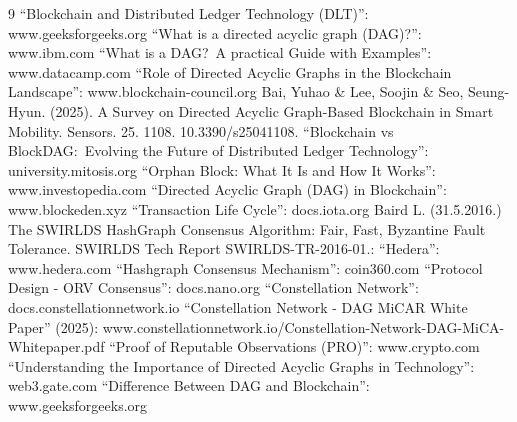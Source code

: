 \begin{thebibliography}{9}
     \enquote{Blockchain and Distributed Ledger Technology (DLT)}: www.geeksforgeeks.org
     \enquote{What is a directed acyclic graph (DAG)?}: www.ibm.com
     \enquote{What is a DAG?~A practical Guide with Examples}: www.datacamp.com
     \enquote{Role of Directed Acyclic Graphs in the Blockchain Landscape}: www.blockchain-council.org
     Bai, Yuhao \& Lee, Soojin \& Seo, Seung-Hyun. (2025). A Survey on Directed Acyclic Graph-Based Blockchain in Smart Mobility. Sensors. 25. 1108. 10.3390/s25041108. 
     \enquote{Blockchain vs BlockDAG:~Evolving the Future of Distributed Ledger Technology}: university.mitosis.org
     \enquote{Orphan Block: What It Is and How It Works}: www.investopedia.com
     \enquote{Directed Acyclic Graph (DAG) in Blockchain}: www.blockeden.xyz
     \enquote{Transaction Life Cycle}: docs.iota.org
     Baird L. (31.5.2016.) The SWIRLDS HashGraph Consensus Algorithm: Fair, Fast, Byzantine Fault Tolerance. SWIRLDS Tech Report SWIRLDS-TR-2016-01.:
     \enquote{Hedera}: www.hedera.com
     \enquote{Hashgraph Consensus Mechanism}: coin360.com
     \enquote{Protocol Design - ORV Consensus}: docs.nano.org
     \enquote{Constellation Network}: docs.constellationnetwork.io
     \enquote{Constellation Network - DAG MiCAR White Paper} (2025): www.constellationnetwork.io/Constellation-Network-DAG-MiCA-Whitepaper.pdf
     \enquote{Proof of Reputable Observations (PRO)}: www.crypto.com
     \enquote{Understanding the Importance of Directed Acyclic Graphs in Technology}: web3.gate.com
     \enquote{Difference Between DAG and Blockchain}: www.geeksforgeeks.org
\end{thebibliography}